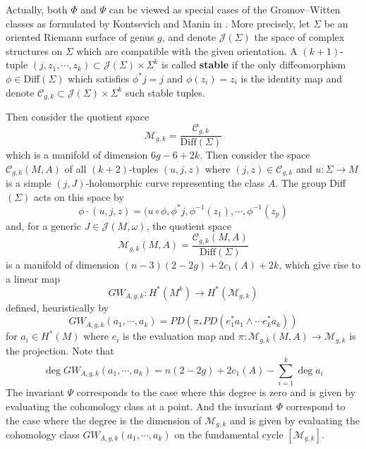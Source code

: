 \documentclass[twoside]{article}
\begin{document}
Actually, both $\Phi$ and $\Psi$ can be viewed as 
special cases of the Gromov--Witten classes as formulated by Kontsevich and Manin in \cite{kontsevich-manin}.
More precisely, let $\Sigma$ be an oriented Riemann surface of genus $g$, 
and denote $\mathscr{J}(\Sigma)$ the space of complex structures on $\Sigma$ 
which are compatible with the given orientation. 
A $(k+1)$-tuple $(j,z_1,\cdots,z_k)\subset \mathscr{J}(\Sigma)\times\Sigma^k$ is called \textbf{stable} 
if the only diffeomorphism $\phi\in$Diff$(\Sigma)$ which satisfies $\phi^*j=j$ 
and $\phi(z_i)=z_i$ is the identity map and denote 
$\mathscr{C}_{g,k}\subset\mathscr{J}(\Sigma)\times\Sigma^k $ such stable tuples.

Then consider the quotient space
\[\mathscr{M}_{g,k}=\frac{\mathscr{C}_{g,k}}{\textrm{Diff}(\Sigma)}\]
which is a manifold of dimension $6g-6+2k$. Then consider the space
$\mathscr{C}_{g,k}(M,A)$ of all $(k+2)$-tuples $(u,j,z)$ where 
$(j,z)\in \mathscr{C}_{g,k}$ and $u\colon \Sigma\rightarrow M$ is a simple 
$(j,J)$-holomorphic curve representing the class $A$. 
The group Diff$(\Sigma)$ acts on this space by
\[\phi\cdot (u,j,z)=(u\circ\phi,\phi^*j,\phi^{-1}(z_1),\cdots,\phi^{-1}(z_p)\]
and, for a generic $J\in\mathscr{J}(M,\omega)$, the quotient space
\[\mathscr{M}_{g,k}(M,A)=\frac{\mathscr{C}_{g,k}(M,A)}{\textrm{Diff}(\Sigma)}\]
is a manifold of dimension $(n-3)(2-2g)+2c_1(A)+2k$, which give rise to a linear map
\[GW_{A,g,k}\colon H^*(M^k)\rightarrow H^*(\mathscr{M}_{g,k})\]
defined, heuristically by
\[GW_{A,g,k}(a_1,\cdots,a_k)=PD(\pi_*PD(e_1^*a_1\wedge\cdots e_k^*a_k))\]
for $a_i\in H^*(M)$ where $e_i$ is the evaluation map and $\pi\colon \mathscr{M}_{g,k}(M,A)\rightarrow \mathscr{M}_{g,k}$ is the projection. 
Note that 
\[\deg GW_{A,g,k}(a_1,\cdots,a_k)=n(2-2g)+2c_1(A)-\sum_{i=1}^{k}\deg a_i\]
The invariant $\Psi$ corresponds to the case where this degree is zero and is given by 
evaluating the cohomology class at a point. 
And the invariant $\Phi$ correspond to the case where the degree is the dimension of $\mathscr{M}_{g,k}$ 
and is given by evaluating the cohomology class $GW_{A,g,k}(a_1,\cdots,a_k)$ 
on the fundamental cycle $\left[ \mathscr{M}_{g,k} \right]$.

\printbibliography
\end{document}
